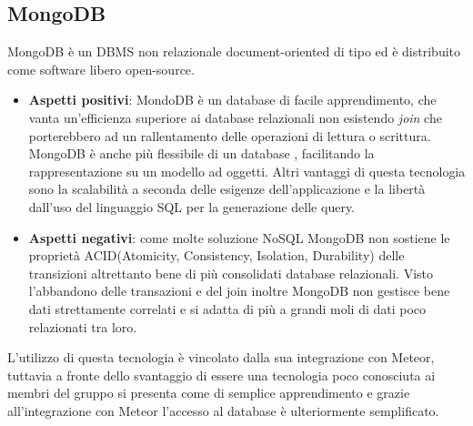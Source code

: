 \subsection{MongoDB}
MongoDB è un DBMS non relazionale document-oriented di tipo  ed è distribuito come software libero open-source. 
\begin{itemize}
	\item \textbf{Aspetti positivi}: MondoDB è un database di facile apprendimento, che vanta un'efficienza superiore ai database relazionali non esistendo \textit{join} che porterebbero ad un rallentamento delle operazioni di lettura o scrittura. MongoDB è anche più flessibile di un database , facilitando la rappresentazione su un modello ad oggetti. Altri vantaggi di questa tecnologia sono la scalabilità a seconda delle esigenze dell'applicazione e la libertà dall'uso del linguaggio SQL per la generazione delle query.
	\item \textbf{Aspetti negativi}: come molte soluzione NoSQL MongoDB non sostiene le proprietà ACID(Atomicity, Consistency, Isolation, Durability) delle transizioni altrettanto bene di più consolidati database relazionali. Visto l'abbandono delle transazioni e del join inoltre MongoDB non gestisce bene dati strettamente correlati e si adatta di più a grandi moli di dati poco relazionati tra loro.
\end{itemize}
L'utilizzo di questa tecnologia è vincolato dalla sua integrazione con Meteor, tuttavia a fronte dello svantaggio di essere una tecnologia poco conosciuta ai membri del gruppo si presenta come di semplice apprendimento e grazie all'integrazione con Meteor l'accesso al database è ulteriormente semplificato.

